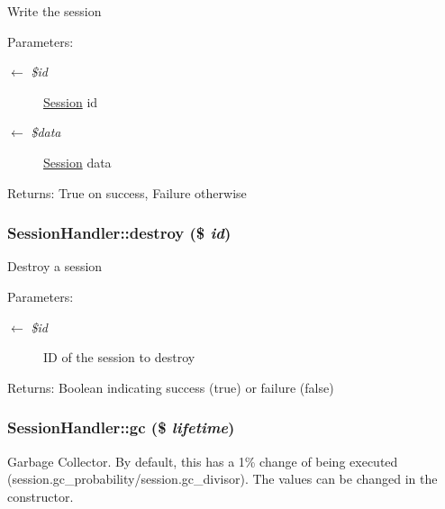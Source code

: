 Write the session

\begin{Desc}
\item[Parameters:]
\begin{description}
\item[\mbox{$\leftarrow$} {\em \$id}]\hyperlink{classSession}{Session} id \item[\mbox{$\leftarrow$} {\em \$data}]\hyperlink{classSession}{Session} data \end{description}
\end{Desc}
\begin{Desc}
\item[Returns:]True on success, Failure otherwise \end{Desc}
\hypertarget{classSessionHandler_4e43712ef307979de1b12039ef801adb}{
\subsubsection{\setlength{\rightskip}{0pt plus 5cm}SessionHandler::destroy (\$ {\em id})}}
\label{classSessionHandler_4e43712ef307979de1b12039ef801adb}


Destroy a session

\begin{Desc}
\item[Parameters:]
\begin{description}
\item[\mbox{$\leftarrow$} {\em \$id}]ID of the session to destroy \end{description}
\end{Desc}
\begin{Desc}
\item[Returns:]Boolean indicating success (true) or failure (false) \end{Desc}
\hypertarget{classSessionHandler_c33097332375ae3f8a43c31cef6db0e8}{
\subsubsection{\setlength{\rightskip}{0pt plus 5cm}SessionHandler::gc (\$ {\em lifetime})}}
\label{classSessionHandler_c33097332375ae3f8a43c31cef6db0e8}


Garbage Collector. By default, this has a 1\% change of being executed (session.gc\_\-probability/session.gc\_\-divisor). The values can be changed in the constructor.

